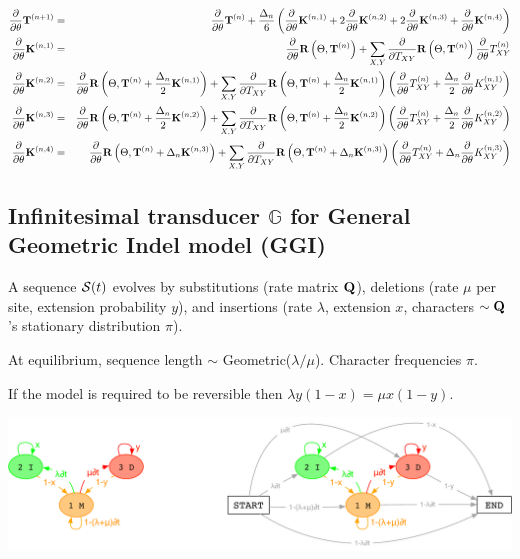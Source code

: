 \documentclass{article}
\begin{document}
\newcommand\ptheta{\frac{\partial}{\partial\theta}}
\newcommand\ptxy{\frac{\partial}{\partial T_{XY}}}
\newcommand\allpartials[1]{\ptheta #1 + \sum_{X,Y} \ptxy #1 \ptheta T_{XY}^{(n)}}
\newcommand\allpartialsk[3]{\ptheta #1 + \sum_{X,Y} \ptxy #1 \left( \ptheta T_{XY}^{(n)} + #2 \ptheta K_{XY}^{(n,#3)} \right)}
\begin{eqnarray*}
  \ptheta {\bf T}^{(n+1)} & = & \ptheta {\bf T}^{(n)} + \frac{\Delta_n}{6} \left( \ptheta {\bf K}^{(n,1)} + 2\ptheta{\bf K}^{(n,2)} + 2\ptheta{\bf K}^{(n,3)} + \ptheta{\bf K}^{(n,4)} \right) \\
  \ptheta {\bf K}^{(n,1)} & = & \allpartials{{\bf R}\left(\Theta,{\bf T}^{(n)}\right)} \\
  \ptheta {\bf K}^{(n,2)} & = & \allpartialsk{{\bf R}\left(\Theta,{\bf T}^{(n)} + \frac{\Delta_n}{2} {\bf K}^{(n,1)}\right)}{\frac{\Delta_n}{2}}{1} \\
  \ptheta {\bf K}^{(n,3)} & = & \allpartialsk{{\bf R}\left(\Theta,{\bf T}^{(n)} + \frac{\Delta_n}{2} {\bf K}^{(n,2)}\right)}{\frac{\Delta_n}{2}}{2} \\
  \ptheta {\bf K}^{(n,4)} & = & \allpartialsk{{\bf R}\left(\Theta,{\bf T}^{(n)} + \Delta_n {\bf K}^{(n,3)}\right)}{\Delta_n}{3}
\end{eqnarray*}

\subsection{Infinitesimal transducer $\mathbb{G}$ for General Geometric Indel model (GGI)}

A sequence ${\cal S}(t)$ evolves by
substitutions (rate matrix ${\bf Q}$),
deletions (rate $\mu$ per site, extension probability $y$),
and
insertions (rate $\lambda$, extension $x$,
characters $\sim {\bf Q}$'s stationary distribution $\pi$).

At equilibrium, sequence length $\sim$ Geometric($\lambda/\mu$). Character frequencies $\pi$.

If the model is required to be reversible then $\lambda y(1-x) = \mu x(1-y)$.

\includegraphics[width=\textwidth]{InstantHMM.pdf}
\end{document}
